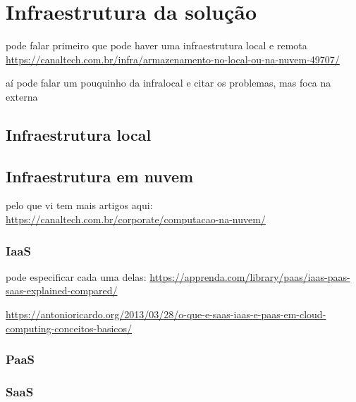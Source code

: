 \chapter{Infraestrutura da solução}

pode falar primeiro que pode haver uma infraestrutura local e remota
\url{https://canaltech.com.br/infra/armazenamento-no-local-ou-na-nuvem-49707/}

aí pode falar um pouquinho da infralocal e citar os problemas,
mas foca na externa

\section{Infraestrutura local}

\section{Infraestrutura em nuvem}

pelo que vi tem mais artigos aqui: \url{https://canaltech.com.br/corporate/computacao-na-nuvem/}

\subsection{IaaS}

pode especificar cada uma delas:
\url{https://apprenda.com/library/paas/iaas-paas-saas-explained-compared/}

\url{https://antonioricardo.org/2013/03/28/o-que-e-saas-iaas-e-paas-em-cloud-computing-conceitos-basicos/}

\subsection{PaaS}

\subsection{SaaS}
